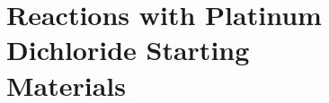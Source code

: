 






\section[Reactions with Platinum Dichloride Starting Materials]{Reactions with Platinum Dichloride Starting \\Materials}

